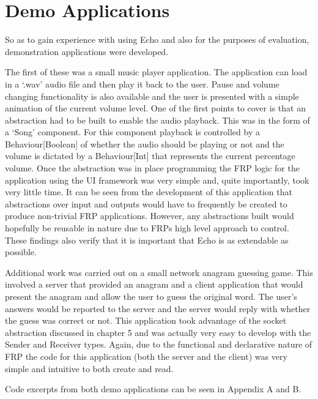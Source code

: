   \section{Demo Applications}
    So as to gain experience with using Echo and also for the purposes of evaluation, demonstration
    applications were developed. 
    
    The first of these was a small music player application. The application
    can load in a `.wav' audio file and then play it back to the user. Pause and volume changing functionality
    is also available and the user is presented with a simple animation of the current volume level. One of the
    first points to cover is that an abstraction had to be built to enable the audio playback. This was in the form
    of a `Song' component. For this component playback is controlled by a Behaviour[Boolean] of whether the audio
    should be playing or not and the volume is dictated by a Behaviour[Int] that represents the current percentage
    volume. Once the abstraction was in place programming the FRP logic for the application using the 
    UI framework was very simple and, quite importantly, took very little time. It can be seen from
    the development of this application that abstractions over input and outputs would have to frequently be
    created to produce non-trivial FRP applications. However, any abstractions built would hopefully be
    reusable in nature due to FRPs high level approach to control. These findings also verify that it
    is important that Echo is as extendable as possible.
    
    Additional work was carried out on a small network anagram guessing game. This involved a server that provided
    an anagram and a client application that would present the anagram and allow the user to guess the original
    word. The user's answers would be reported to the server and the server would reply with whether
    the guess was correct or not. This application took advantage of the socket abstraction discussed in chapter 5
    and was actually very easy to develop with the Sender and Receiver types. Again, due to the functional and
    declarative nature of FRP the code for this application (both the server and the client) was very simple
    and intuitive to both create and read.
    
    Code excerpts from both demo applications can be seen in Appendix A and B. 